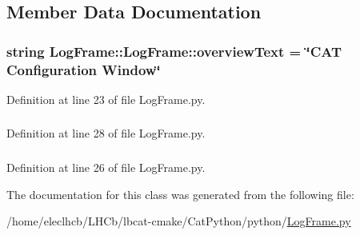 \subsection{Member Data Documentation}
\hypertarget{classLogFrame_1_1LogFrame_a61a37e9b6e320a82c09e29a93bd6e210}{
\subsubsection[{overviewText}]{\setlength{\rightskip}{0pt plus 5cm}string {\bf LogFrame::LogFrame::overviewText} = \char`\"{}CAT Configuration Window\char`\"{}}}
\label{classLogFrame_1_1LogFrame_a61a37e9b6e320a82c09e29a93bd6e210}


Definition at line 23 of file LogFrame.py.\hypertarget{classLogFrame_1_1LogFrame_a32d544d8fe1641e885737f9a0525be7f}{
\subsubsection[{panel}]{}}
\label{classLogFrame_1_1LogFrame_a32d544d8fe1641e885737f9a0525be7f}


Definition at line 28 of file LogFrame.py.\hypertarget{classLogFrame_1_1LogFrame_a944ed19f97020b9ce09b56a0b1f036d9}{
\subsubsection[{path}]{}}
\label{classLogFrame_1_1LogFrame_a944ed19f97020b9ce09b56a0b1f036d9}


Definition at line 26 of file LogFrame.py.

The documentation for this class was generated from the following file:\begin{DoxyCompactItemize}
\item 
/home/eleclhcb/LHCb/lbcat-\/cmake/CatPython/python/\hyperlink{LogFrame_8py}{LogFrame.py}\end{DoxyCompactItemize}
